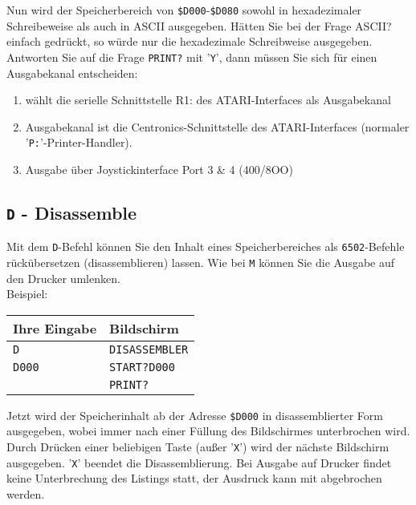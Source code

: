 \documentclass[10pt,a4paper,twoside,final,openright,titlepage]{memoir}
\newcommand{\key}[1]{\keystroke{\tiny #1}}
\begin{document}
Nun wird der Speicherbereich von \texttt{\$D000}-\texttt{\$D080} sowohl in
hexadezimaler Schreibeweise als auch in ASCII ausgegeben. Hätten Sie bei der Frage ASCII? einfach
\key{RETURN} gedrückt, so würde nur die hexadezimale
Schreibweise ausgegeben. Antworten Sie auf die Frage
\texttt{PRINT?} mit '\texttt{Y}', dann müssen Sie sich für einen
Ausgabekanal entscheiden:

\begin{enumerate}
\item wählt die serielle Schnittstelle R1: des
	ATARI-Interfaces als Ausgabekanal
\item Ausgabekanal ist die Centronics-Schnittstelle des
	ATARI-Interfaces (normaler '\texttt{P:}'-Printer-Handler).
\item Ausgabe über Joystickinterface Port 3 \& 4 (400/8OO)
\end{enumerate}

\subsection{\texttt{D} - Disassemble}

Mit dem \texttt{D}-Befehl können Sie den Inhalt eines Speicherbereiches als \texttt{6502}-Befehle rückübersetzen
(disassemblieren) lassen. Wie bei \texttt{M} können Sie die Ausgabe auf
den Drucker umlenken. \\

Beispiel: \\

\renewcommand{\arraystretch}{1.2}
\begin{tabular}{p{10em}p{10em}}
Ihre Eingabe	& Bildschirm \\ \hline
\texttt{D}		& \texttt{DISASSEMBLER} \\
\texttt{D000}	& \texttt{START?D000} \\
\key{RETURN}	& \texttt{PRINT?} \\
\end{tabular}
\renewcommand{\arraystretch}{1.8}
\bigskip

Jetzt wird der Speicherinhalt ab der Adresse \texttt{\$D000} in
disassemblierter Form ausgegeben, wobei immer nach
einer Füllung des Bildschirmes unterbrochen wird.
Durch Drücken einer beliebigen Taste (außer '\texttt{X}') wird
der nächste Bildschirm ausgegeben. '\texttt{X}' beendet die
Disassemblierung. Bei Ausgabe auf Drucker findet keine
Unterbrechung des Listings statt, der Ausdruck kann
mit \key{RESET} abgebrochen werden.
\end{document}
